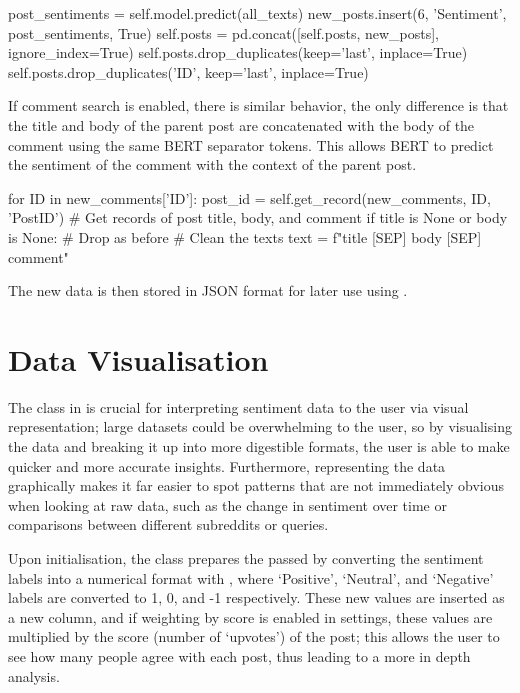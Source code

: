 \begin{python}
post_sentiments = self.model.predict(all_texts)
new_posts.insert(6, 'Sentiment', post_sentiments, True)
self.posts = pd.concat([self.posts, new_posts], ignore_index=True)
self.posts.drop_duplicates(keep='last', inplace=True)
self.posts.drop_duplicates('ID', keep='last', inplace=True)
\end{python}

If comment search is enabled, there is similar behavior, the only difference is that the title and body of the parent post are concatenated with the body of the comment using the same BERT separator tokens. This allows BERT to predict the sentiment of the comment with the context of the parent post.

\begin{python}
for ID in new_comments['ID']:
    post_id = self.get_record(new_comments, ID, 'PostID')
    # Get records of post title, body, and comment
    if title is None or body is None:
        # Drop as before
    # Clean the texts
    text = f"{title} [SEP] {body} [SEP] {comment}"
\end{python}

The new data is then stored in JSON format for later use using .

\section{Data Visualisation}
The  class in  is crucial for interpreting sentiment data to the user via visual representation; large datasets could be overwhelming to the user, so by visualising the data and breaking it up into more digestible formats, the user is able to make quicker and more accurate insights. Furthermore, representing the data graphically makes it far easier to spot patterns that are not immediately obvious when looking at raw data, such as the change in sentiment over time or comparisons between different subreddits or queries.

Upon initialisation, the  class prepares the passed  by converting the sentiment labels into a numerical format with , where `Positive', `Neutral', and `Negative' labels are converted to 1, 0, and -1 respectively. These new values are inserted as a new column, and if weighting by score is enabled in settings, these values are multiplied by the score (number of `upvotes') of the post; this allows the user to see how many people agree with each post, thus leading to a more in depth analysis. 

